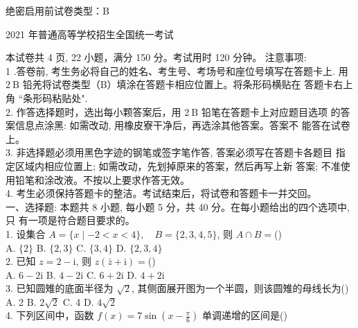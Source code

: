 \documentclass[UTF8]{ctexart}
\begin{document}
	
	
 \noindent 绝密启用前\qquad\qquad\qquad\qquad\qquad\qquad\qquad\qquad\qquad\qquad\qquad\qquad\qquad\qquad\qquad 试卷类型：B\\

	\centerline{\LARGE 2021 年普通高等学校招生全国统一考试}
	
	本试卷共 4 页, 22 小题，满分 150 分。考试用时 120 分钟。 注意事项:\\
	1 .答卷前, 考生务必将自己的姓名、考生号、考场号和座位号填写在答题卡上. 用 $2 \mathrm{~B}$ 铅羌将试卷类型（B）填涂在答题卡相应位置上。将条形码横贴在 答题卡右上角 “条形码粘贴处".\\
	2. 作答选择题时，选出每小颗答案后，用 $2 \mathrm{~B}$ 铅笔在答题卡上对应题目选项 的答案信息点涂黑: 如需改动, 用橡皮寮干净后，再选涂其他答案。答案不 能答在试卷上。\\
	3. 非选择题必须用黑色字迹的钢笔或签字笔作答, 答案必须写在答题卡各题目 指定区域内相应位置上; 如需改动，先划掉原来的答案，然后再写上新 答案; 不准使用铅笔和涂改液。不按以上要求作答无效。\\
	4. 考生必须保持答题卡的整洁。考试结束后，将试卷和答题卡一并交回。\\
	
	一、选择题: 本题共 8 小题, 每小题 5 分，共 40 分。在每小题给出的四个选项中, 只
	有一项是符合题目要求的。\\
	
	1. 设集合 $A=\{x \mid-2<x<4\}, \quad B=\{2,3,4,5\}$, 则 $A \cap B=$(\qquad)\\
	
	A. $\{2\}$\qquad
	B. $\{2,3\}$\qquad
	C. $\{3,4\}$\qquad
	D. $\{2,3,4\}$\\
	
	2. 已知 $z=2-\mathrm{i}$, 则 $z(\bar{z}+\mathrm{i})=$(\qquad)\\
	
	A. $6-2 \mathrm{i}$\qquad
	B. $4-2 \mathrm{i}$\qquad
	C. $6+2 \mathrm{i}$\qquad
	D. $4+2 \mathrm{i}$\\
	
	3. 已知圆雉的底面半径为 $\sqrt{2}$, 其侧面展开图为一个半圆，则该圆雉的母线长为(\qquad)\\
	
	A. 2\qquad
	B. $2 \sqrt{2}$\qquad
	C. 4\qquad
	D. $4 \sqrt{2}$\\
	
	4. 下列区间中，函数 $f(x)=7 \sin \left(x-\displaystyle{\frac{\pi}{6}}\right)$ 单调递增的区间是(\qquad)\\
	
\end{document}
